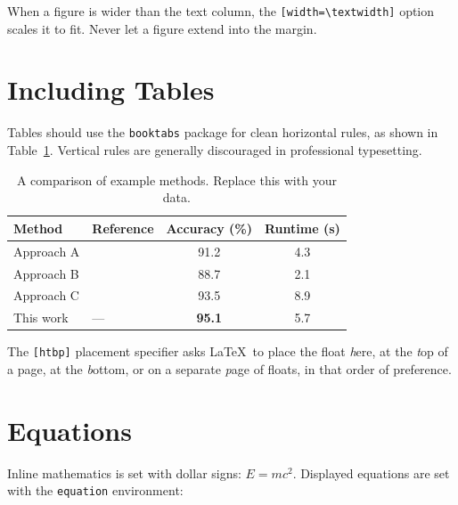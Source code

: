 When a figure is wider than the text column, the \verb|[width=\textwidth]|
option scales it to fit.
Never let a figure extend into the margin.

\section{Including Tables}
\label{sec:tables}

Tables should use the \texttt{booktabs} package for clean horizontal
rules, as shown in Table~\ref{tab:example}.
Vertical rules are generally discouraged in professional typesetting.

\begin{table}[htbp]
  \centering
  \caption[Short caption for the List of Tables]{%
    A comparison of example methods.  Replace this with your data.}
  \label{tab:example}
  \begin{tabular}{llcc}
    \toprule
    Method      & Reference              & Accuracy (\%) & Runtime (s) \\
    \midrule
    Approach A  & \cite{lamport1994latex}  & 91.2          & 4.3         \\
    Approach B  & \cite{knuth1986texbook}  & 88.7          & 2.1         \\
    Approach C  & \cite{kopka1999guide}    & 93.5          & 8.9         \\
    \midrule
    This work   & ---                    & \textbf{95.1} & 5.7         \\
    \bottomrule
  \end{tabular}
\end{table}

The \texttt{[htbp]} placement specifier asks \LaTeX\ to place the float
\textit{h}ere, at the \textit{t}op of a page, at the \textit{b}ottom,
or on a separate \textit{p}age of floats, in that order of preference.

\section{Equations}
\label{sec:equations}

Inline mathematics is set with dollar signs: $E = mc^2$.
Displayed equations are set with the \texttt{equation} environment:

